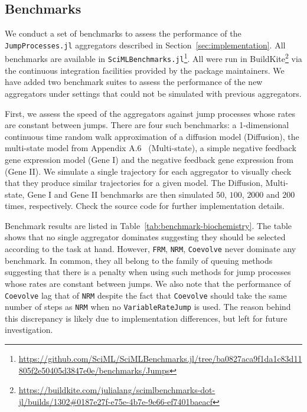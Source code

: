 \documentclass{juliacon}
\numberwithin{equation}{section}
\begin{document}
\subsection{Benchmarks} \label{subsec:benchmark}

We conduct a set of benchmarks to assess the performance of the \texttt{JumpProcesses.jl} aggregators described in Section~\ref{sec:implementation}. All benchmarks are available in \texttt{SciMLBenchmarks.jl}\footnote{\url{https://github.com/SciML/SciMLBenchmarks.jl/tree/ba0827aca9f1da1c83d11805f2e50405d3847e0e/benchmarks/Jumps}}. All were run in BuildKite\footnote{\url{https://buildkite.com/julialang/scimlbenchmarks-dot-jl/builds/1302\#0187e27f-e75e-4b7e-9e66-ef7401baeacf}} via the continuous integration facilities provided by the package maintainers. We have added two benchmark suites to assess the performance of the new aggregators under settings that could not be simulated with previous aggregators.

First, we assess the speed of the aggregators against jump processes whose rates are constant between jumps. There are four such benchmarks: a 1-dimensional continuous time random walk approximation of a diffusion model (Diffusion), the multi-state model from Appendix A.6~\cite{marchetti2017} (Multi-state), a simple negative feedback gene expression model (Gene I) and the negative feedback gene expression from~\cite{gupta2018} (Gene II). We simulate a single trajectory for each aggregator to visually check that they produce similar trajectories for a given model. The Diffusion, Multi-state, Gene I and Gene II benchmarks are then simulated \( 50 \), \( 100 \), \( 2000 \) and \( 200 \) times, respectively. Check the source code for further implementation details.

Benchmark results are listed in Table~\ref{tab:benchmark-biochemistry}. The table shows that no single aggregator dominates suggesting they should be selected according to the task at hand. However, \texttt{FRM}, \texttt{NRM}, \texttt{Coevolve} never dominate any benchmark. In common, they all belong to the family of queuing methods suggesting that there is a penalty when using such methods for jump processes whose rates are constant between jumps. We also note that the performance of \texttt{Coevolve} lag that of \texttt{NRM} despite the fact that \texttt{Coevolve} should take the same number of steps as \texttt{NRM} when no \texttt{VariableRateJump} is used. The reason behind this discrepancy is likely due to implementation differences, but left for future investigation.
\end{document}
